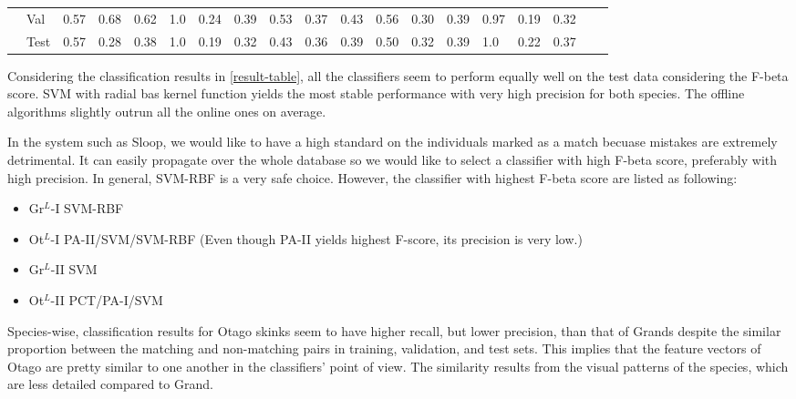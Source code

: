 {\begin{landscape}
\begin{table}
\begin{tabular}{lllll|lll|lll|lll|lllll}
                                       & Val  & 0.57 & 0.68 & 0.62 & 1.0 & 0.24 & 0.39 & 0.53 & 0.37 & 0.43 & 0.56 & 0.30 & 0.39 & 0.97 & 0.19 & 0.32   \\
                                       & Test  & 0.57 & 0.28 & 0.38  & 1.0 & 0.19 & 0.32 & 0.43 & 0.36 & 0.39 & 0.50 & 0.32 & 0.39 & 1.0 & 0.22 & 0.37     \\
          \bottomrule
        \end{tabular}
      \end{table}
    \end{landscape}
    \clearpage%
}



Considering the classification results in \ref{result-table}, all the classifiers seem to perform equally well on the test data considering the F-beta score. SVM with radial bas kernel function yields the most stable performance with very high precision for both species. The offline algorithms slightly outrun all the online ones on average.

In the system such as Sloop, we would like to have a high standard on the individuals marked as a match becuase mistakes are extremely detrimental. It can easily propagate over the whole database so we would like to select a classifier with high F-beta score, preferably with high precision. In general, SVM-RBF is a very safe choice. However, the classifier with highest F-beta score are listed as following:

\begin{itemize}
  \item Gr$^{L}$-I SVM-RBF
  \item Ot$^{L}$-I PA-II/SVM/SVM-RBF (Even though PA-II yields highest F-score, its precision is very low.)
  \item Gr$^{L}$-II SVM
  \item Ot$^{L}$-II PCT/PA-I/SVM
\end{itemize}

Species-wise, classification results for Otago skinks seem to have higher recall, but lower precision, than that of Grands despite the similar proportion between the matching and non-matching pairs in training, validation, and test sets. This implies that the feature vectors of Otago are pretty similar to one another in the classifiers' point of view. The similarity results from the visual patterns of the species, which are less detailed compared to Grand.

